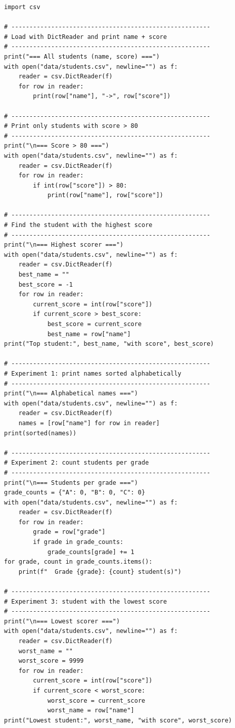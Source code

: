 \documentclass{cslab}
\begin{document}
\begin{lstlisting}
import csv

# -------------------------------------------------------
# Load with DictReader and print name + score
# -------------------------------------------------------
print("=== All students (name, score) ===")
with open("data/students.csv", newline="") as f:
    reader = csv.DictReader(f)
    for row in reader:
        print(row["name"], "->", row["score"])

# -------------------------------------------------------
# Print only students with score > 80
# -------------------------------------------------------
print("\n=== Score > 80 ===")
with open("data/students.csv", newline="") as f:
    reader = csv.DictReader(f)
    for row in reader:
        if int(row["score"]) > 80:
            print(row["name"], row["score"])

# -------------------------------------------------------
# Find the student with the highest score
# -------------------------------------------------------
print("\n=== Highest scorer ===")
with open("data/students.csv", newline="") as f:
    reader = csv.DictReader(f)
    best_name = ""
    best_score = -1
    for row in reader:
        current_score = int(row["score"])
        if current_score > best_score:
            best_score = current_score
            best_name = row["name"]
print("Top student:", best_name, "with score", best_score)

# -------------------------------------------------------
# Experiment 1: print names sorted alphabetically
# -------------------------------------------------------
print("\n=== Alphabetical names ===")
with open("data/students.csv", newline="") as f:
    reader = csv.DictReader(f)
    names = [row["name"] for row in reader]
print(sorted(names))

# -------------------------------------------------------
# Experiment 2: count students per grade
# -------------------------------------------------------
print("\n=== Students per grade ===")
grade_counts = {"A": 0, "B": 0, "C": 0}
with open("data/students.csv", newline="") as f:
    reader = csv.DictReader(f)
    for row in reader:
        grade = row["grade"]
        if grade in grade_counts:
            grade_counts[grade] += 1
for grade, count in grade_counts.items():
    print(f"  Grade {grade}: {count} student(s)")

# -------------------------------------------------------
# Experiment 3: student with the lowest score
# -------------------------------------------------------
print("\n=== Lowest scorer ===")
with open("data/students.csv", newline="") as f:
    reader = csv.DictReader(f)
    worst_name = ""
    worst_score = 9999
    for row in reader:
        current_score = int(row["score"])
        if current_score < worst_score:
            worst_score = current_score
            worst_name = row["name"]
print("Lowest student:", worst_name, "with score", worst_score)
\end{lstlisting}
\end{document}
